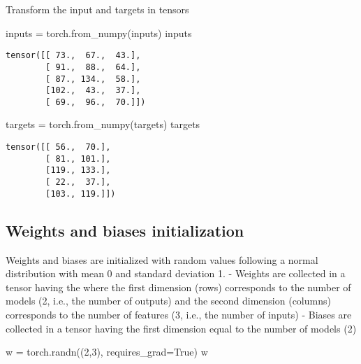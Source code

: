\documentclass[
  letterpaper,
  DIV=11,
  numbers=noendperiod]{scrartcl}
\newenvironment{Shaded}{\begin{snugshade}}{\end{snugshade}}
\newcommand{\DecValTok}[1]{\textcolor[rgb]{0.68,0.00,0.00}{#1}}
\newcommand{\NormalTok}[1]{\textcolor[rgb]{0.00,0.23,0.31}{#1}}
\newcommand{\OperatorTok}[1]{\textcolor[rgb]{0.37,0.37,0.37}{#1}}
\newcommand{\VariableTok}[1]{\textcolor[rgb]{0.07,0.07,0.07}{#1}}
\begin{document}
Transform the input and targets in tensors

\begin{Shaded}
\begin{Highlighting}[]
\NormalTok{inputs }\OperatorTok{=}\NormalTok{ torch.from\_numpy(inputs)}
\NormalTok{inputs}
\end{Highlighting}
\end{Shaded}

\begin{verbatim}
tensor([[ 73.,  67.,  43.],
        [ 91.,  88.,  64.],
        [ 87., 134.,  58.],
        [102.,  43.,  37.],
        [ 69.,  96.,  70.]])
\end{verbatim}

\begin{Shaded}
\begin{Highlighting}[]
\NormalTok{targets }\OperatorTok{=}\NormalTok{ torch.from\_numpy(targets)}
\NormalTok{targets}
\end{Highlighting}
\end{Shaded}

\begin{verbatim}
tensor([[ 56.,  70.],
        [ 81., 101.],
        [119., 133.],
        [ 22.,  37.],
        [103., 119.]])
\end{verbatim}

\hypertarget{weights-and-biases-initialization}{%
\subsection{Weights and biases
initialization}\label{weights-and-biases-initialization}}

Weights and biases are initialized with random values following a normal
distribution with mean 0 and standard deviation 1. - Weights are
collected in a tensor having the where the first dimension (rows)
corresponds to the number of models (2, i.e., the number of outputs) and
the second dimension (columns) corresponds to the number of features (3,
i.e., the number of inputs) - Biases are collected in a tensor having
the first dimension equal to the number of models (2)

\begin{Shaded}
\begin{Highlighting}[]
\NormalTok{w }\OperatorTok{=}\NormalTok{ torch.randn((}\DecValTok{2}\NormalTok{,}\DecValTok{3}\NormalTok{), requires\_grad}\OperatorTok{=}\VariableTok{True}\NormalTok{)}
\NormalTok{w}
\end{Highlighting}
\end{Shaded}
\end{document}
